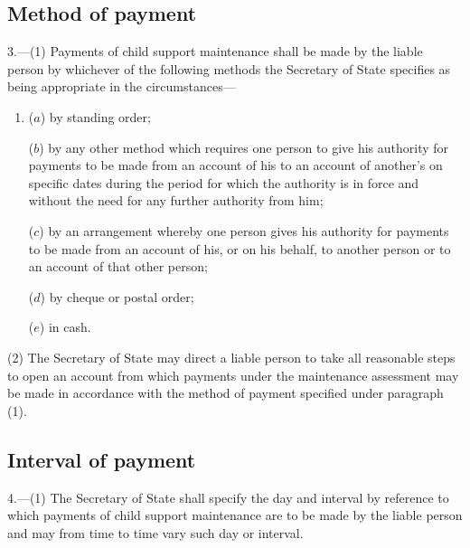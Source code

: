\documentclass[12pt,a4paper]{article}
\begin{document}
\subsection[3. Method of payment]{Method of payment}

3.—(1) Payments of child support maintenance shall be made by the liable person by whichever of the following methods the Secretary of State specifies as being appropriate in the circumstances—
\begin{enumerate}\item[]
($a$) by standing order;

($b$) by any other method which requires one person to give his authority for payments to be made from an account of his to an account of another’s on specific dates during the period for which the authority is in force and without the need for any further authority from him;

($c$) by an arrangement whereby one person gives his authority for payments to be made from an account of his, or on his behalf, to another person or to an account of that other person;

($d$) by cheque or postal order;

($e$) in cash.
\end{enumerate}

(2) The Secretary of State may direct a liable person to take all reasonable steps to open an account from which payments under the maintenance assessment may be made in accordance with the method of payment specified under paragraph (1).

\subsection[4. Interval of payment]{Interval of payment}

4.—(1) The Secretary of State shall specify the day and interval by reference to which payments of child support maintenance are to be made by the liable person and may from time to time vary such day or interval.

%
%
\end{document}
